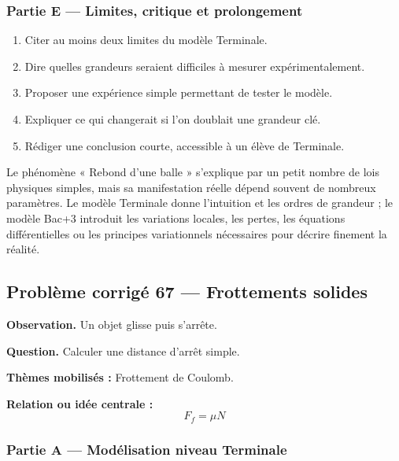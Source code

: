 \documentclass[11pt,a4paper]{article}
\begin{document}
\subsubsection*{Partie E — Limites, critique et prolongement}

\begin{enumerate}
  \item Citer au moins deux limites du modèle Terminale.
  \item Dire quelles grandeurs seraient difficiles à mesurer expérimentalement.
  \item Proposer une expérience simple permettant de tester le modèle.
  \item Expliquer ce qui changerait si l'on doublait une grandeur clé.
  \item Rédiger une conclusion courte, accessible à un élève de Terminale.
\end{enumerate}

\begin{corrigebox}
Le phénomène « Rebond d'une balle » s'explique par un petit nombre de lois physiques simples, mais sa manifestation réelle dépend souvent de nombreux paramètres. Le modèle Terminale donne l'intuition et les ordres de grandeur ; le modèle Bac+3 introduit les variations locales, les pertes, les équations différentielles ou les principes variationnels nécessaires pour décrire finement la réalité.
\end{corrigebox}

\subsection{Problème corrigé 67 — Frottements solides}

\begin{exercicebox}
\textbf{Observation.} Un objet glisse puis s'arrête.

\medskip
\textbf{Question.} Calculer une distance d'arrêt simple.

\medskip
\textbf{Thèmes mobilisés :} Frottement de Coulomb.

\medskip
\textbf{Relation ou idée centrale :}
\[
F_f=\mu N
\]
\end{exercicebox}

\subsubsection*{Partie A — Modélisation niveau Terminale}
\end{document}
